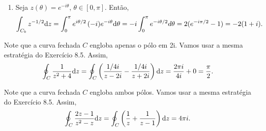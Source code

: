\begin{questions}
\begin{solution}
\begin{enumerate}[label=(\alph*)]
    \item Seja $z(\theta) = e^{-i\theta}$, $\theta\in[0,\pi]$. Então,
        \begin{align*}
            \int_{C_b} z^{-1/2} \mathrm{d} z 
                = \int_0^\pi e^{i\theta/2}\, (-i) e^{-i\theta} \mathrm{d} \theta
                = -i \int_0^\pi e^{-i\theta/2} d\theta
                = 2(e^{-i\pi/2}-1)
                = -2(1+i).
        \end{align*}
   \end{enumerate}
\end{solution}


\setcounter{question}{7}
\begin{solution}
    Note que a curva fechada $C$ engloba apenas o pólo em 2i. Vamos usar a mesma estratégia do Exercício 8.5. Assim,
    \begin{align*}
        \oint_C \frac{1}{z^2 + 4} \mathrm{d} z
            = \oint_C \left( \frac{1/4i}{z - 2i} - \frac{1/4i}{z + 2i} \right) \mathrm{d} z
            = \frac{2\pi i}{4 i} + 0 = \frac{\pi}{2}.
    \end{align*}
\end{solution}

\begin{solution}
    Note que a curva fechada $C$ engloba ambos pólos. Vamos usar a mesma estratégia do Exercício 8.5. Assim,
    \begin{align*}
        \oint_C \frac{2z-1}{z^2 - z} \mathrm{d} z
            = \oint_C \left( \frac{1}{z} + \frac{1}{z - 1} \right) \mathrm{d} z
            = 4\pi i.
    \end{align*}
\end{solution}


\end{questions}
